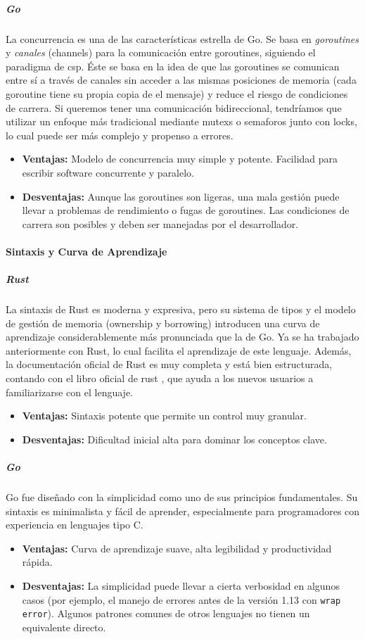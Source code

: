 \subparagraph{Go}
La concurrencia es una de las características estrella de Go. Se basa en \textit{goroutines} y \textit{canales} (channels) para la comunicación entre goroutines, siguiendo el paradigma de \acrfull{csp}.
Éste se basa en la idea de que las goroutines se comunican entre sí a través de canales sin acceder a las mismas posiciones de memoria (cada goroutine tiene su propia copia de el mensaje) y reduce el riesgo de condiciones de carrera.
Si queremos tener una comunicación bidireccional, tendríamos que utilizar un enfoque más tradicional mediante \glspl{mutex} o \glspl{semaforo} junto con \glspl{lock}, lo cual puede ser más complejo y propenso a errores.
\begin{itemize}
    \item \textbf{Ventajas:} Modelo de concurrencia muy simple y potente. Facilidad para escribir software concurrente y paralelo.
    \item \textbf{Desventajas:} Aunque las goroutines son ligeras, una mala gestión puede llevar a problemas de rendimiento o fugas de goroutines. Las condiciones de carrera son posibles y deben ser manejadas por el desarrollador.
\end{itemize}

\paragraph{Sintaxis y Curva de Aprendizaje}
\subparagraph{Rust}
La sintaxis de Rust es moderna y expresiva, pero su sistema de tipos y el modelo de gestión de memoria (ownership y borrowing) introducen una curva de aprendizaje considerablemente más pronunciada que la de Go.
Ya se ha trabajado anteriormente con Rust, lo cual facilita el aprendizaje de este lenguaje.
Además, la documentación oficial de Rust es muy completa y está bien estructurada, contando con el libro oficial de rust \parencite{rustbook2021}, que ayuda a los nuevos usuarios a familiarizarse con el lenguaje.
\begin{itemize}
    \item \textbf{Ventajas:} Sintaxis potente que permite un control muy granular.
    \item \textbf{Desventajas:} Dificultad inicial alta para dominar los conceptos clave.
\end{itemize}

\subparagraph{Go}
Go fue diseñado con la simplicidad como uno de sus principios fundamentales. Su sintaxis es minimalista y fácil de aprender, especialmente para programadores con experiencia en lenguajes tipo C.
\begin{itemize}
    \item \textbf{Ventajas:} Curva de aprendizaje suave, alta legibilidad y productividad rápida.
    \item \textbf{Desventajas:} La simplicidad puede llevar a cierta verbosidad en algunos casos (por ejemplo, el manejo de errores antes de la versión 1.13 con \texttt{wrap error}). Algunos patrones comunes de otros lenguajes no tienen un equivalente directo.
\end{itemize}

